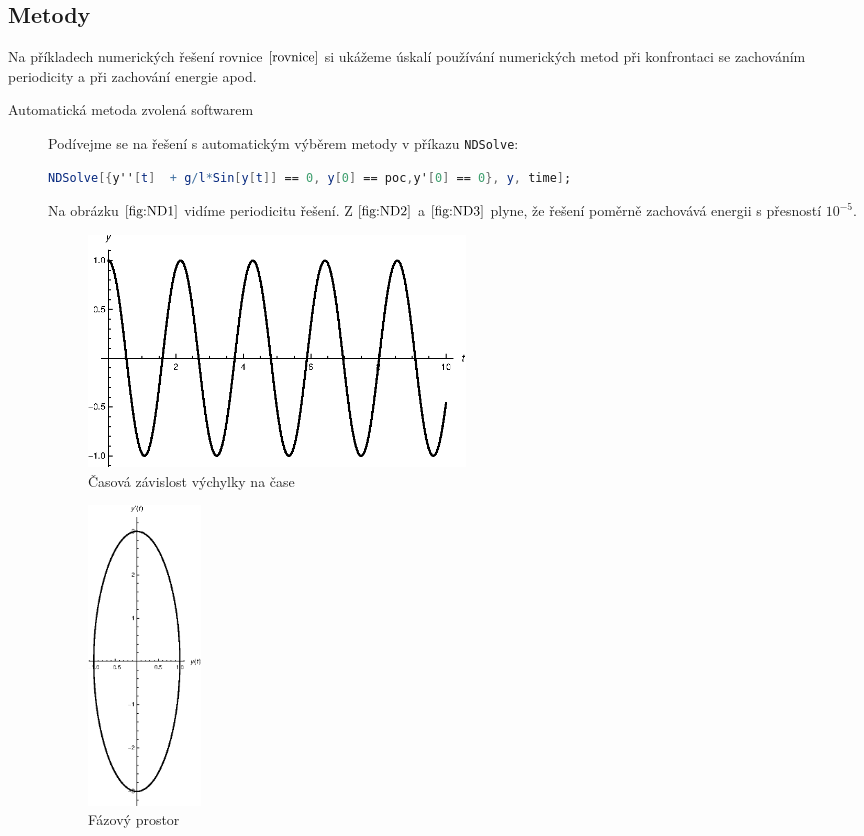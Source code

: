 {\subsection{Metody}
\label{sec:Metody}

Na příkladech numerických řešení rovnice $\eqref{rovnice}$ si ukážeme úskalí používání numerických metod při konfrontaci se zachováním periodicity a při zachování energie apod. 

\begin{description}
\item[Automatická metoda zvolená softwarem] Podívejme se na řešení s automatickým výběrem metody v příkazu \texttt{NDSolve}:

\begin{lstlisting}[language=Mathematica]
NDSolve[{y''[t]  + g/l*Sin[y[t]] == 0, y[0] == poc,y'[0] == 0}, y, time];
\end{lstlisting}

Na obrázku $\eqref{fig:ND1}$ vidíme periodicitu řešení. Z $\eqref{fig:ND2}$ a $\eqref{fig:ND3}$ plyne, že řešení poměrně zachovává energii s přesností $10^{-5}$.

\begin{figure}[h]
  \centering
  \includegraphics[width=10cm]{figures/ND1.eps}
  \caption{Časová závislost výchylky na čase}
  \label{fig:ND1}
\end{figure}

\begin{figure}[h]
  \centering
  \includegraphics[width=3cm]{figures/ND2.eps}
  \caption{Fázový prostor}
  \label{fig:ND2}
\end{figure}


\end{description}}
